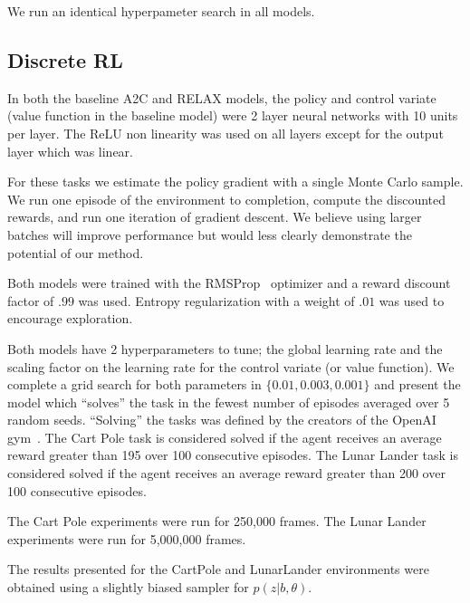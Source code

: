 \documentclass{article}
\begin{document}
We run an identical hyperpameter search in all models. 


\subsection{Discrete RL}
In both the baseline A2C and RELAX models, the policy and control variate (value function in the baseline model) were 2 layer neural networks with 10 units per layer.
The ReLU non linearity was used on all layers except for the output layer which was linear.

For these tasks we estimate the policy gradient with a single Monte Carlo sample.
We run one episode of the environment to completion, compute the discounted rewards, and run one iteration of gradient descent.
We believe using larger batches will improve performance but would less clearly demonstrate the potential of our method. 


Both models were trained with the RMSProp~\citep{Tieleman2012} optimizer and a reward discount factor of $.99$ was used. Entropy regularization with a weight of $.01$ was used to  encourage exploration. 

Both models have 2 hyperparameters to tune; the global learning rate and the scaling factor on the learning rate for the control variate (or value function).
We complete a grid search for both parameters in $\{0.01, 0.003, 0.001\}$ and present the model which ``solves'' the task in the fewest number of episodes averaged over 5 random seeds.
``Solving'' the tasks was defined by the creators of the OpenAI gym~\citep{1606.01540}.
The Cart Pole task is considered solved if the agent receives an average reward greater than 195 over 100 consecutive episodes.
The Lunar Lander task is considered solved if the agent receives an average reward greater than 200 over 100 consecutive episodes. 

The Cart Pole experiments were run for 250,000 frames.
The Lunar Lander experiments were run for 5,000,000 frames. 

The results presented for the CartPole and LunarLander environments were obtained using a slightly biased sampler for $p(z|b, \theta)$.
\end{document}
